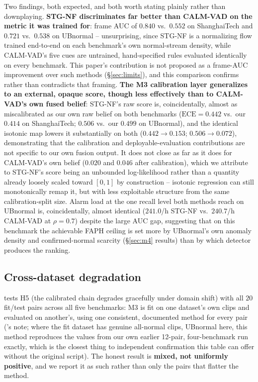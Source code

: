 \documentclass[conference]{IEEEtran}
\newcommand{\ece}{\mathrm{ECE}}
\begin{document}


Two findings, both expected, and both worth stating plainly rather than
downplaying. \textbf{STG-NF discriminates far better than CALM-VAD on the
metric it was trained for}: frame AUC of $0.840$ vs.\ $0.552$ on
ShanghaiTech and $0.721$ vs.\ $0.538$ on UBnormal -- unsurprising, since
STG-NF is a normalizing flow trained end-to-end on each benchmark's own
normal-stream density, while CALM-VAD's five cues are untrained,
hand-specified rules evaluated identically on every benchmark. This paper's
contribution is not proposed as a frame-AUC improvement over such methods
(\S\ref{sec:limits}), and this comparison confirms rather than contradicts
that framing. \textbf{The M3 calibration layer generalizes to an external,
opaque score, though less effectively than to CALM-VAD's own fused belief}:
STG-NF's raw score is, coincidentally, almost as miscalibrated as our own
raw belief on both benchmarks ($\ece=0.442$ vs.\ our $0.414$ on
ShanghaiTech; $0.506$ vs.\ our $0.499$ on UBnormal), and the identical
isotonic map lowers it substantially on both ($0.442\!\to\!0.153$;
$0.506\!\to\!0.072$), demonstrating that the calibration and
deployable-evaluation contributions are not specific to our own fusion
output. It does not close as far as it does for CALM-VAD's own belief
($0.020$ and $0.046$ after calibration), which we attribute to STG-NF's
score being an unbounded log-likelihood rather than a quantity already
loosely scaled toward $[0,1]$ by construction -- isotonic regression can
still monotonically remap it, but with less exploitable structure from the
same calibration-split size. Alarm load at the one recall level both
methods reach on UBnormal is, coincidentally, almost identical ($241.0$/h
STG-NF vs.\ $240.7$/h CALM-VAD at $\rho{=}0.7$) despite the large AUC gap,
suggesting that on this benchmark the achievable FAPH ceiling is set more by
UBnormal's own anomaly density and confirmed-normal scarcity
(\S\ref{sec:m4} results) than by which detector produces the ranking.

\subsection{Cross-dataset degradation}

 tests H5 (the calibrated chain degrades gracefully under
domain shift) with all $20$ fit/test pairs across all five benchmarks: M3 is
fit on one dataset's own clips and evaluated on another's, using one
consistent, documented method for every pair ('s note; where
the fit dataset has genuine all-normal clips, UBnormal here, this method
reproduces the values from our own earlier 12-pair, four-benchmark run
exactly, which is the closest thing to independent confirmation this table
can offer without the original script). The honest result is \textbf{mixed,
not uniformly positive}, and we report it as such rather than only the pairs
that flatter the method.
\end{document}
